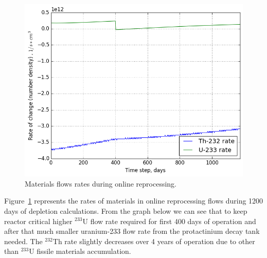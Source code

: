 \documentclass{anstrans}
\begin{document}
\begin{figure}[htbp!] %
        \centering
        \includegraphics[width=1.03\linewidth]{rates_fuel.png}
        \caption{Materials flows rates during online reprocessing.}
        \label{fig:rates}
\end{figure}

Figure~\ref{fig:rates} represents the rates of materials in online reprocessing 
flows during 1200 days of depletion calculations. From the graph below we can 
see that to keep reactor critical higher $^{233}$U 
flow rate required for first 400 days of operation and after that much smaller 
uranium-233 flow rate from the protactinium decay tank needed. The $^{232}$Th 
rate slightly decreases over 4 years of operation due to other than $^{233}$U 
fissile materials accumulation.
\end{document}
